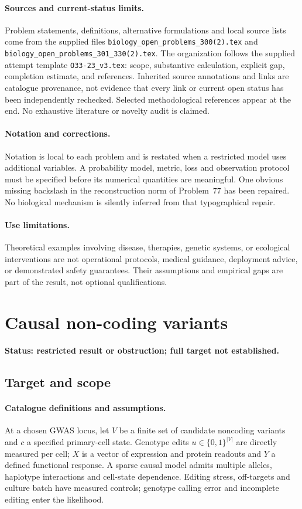 \documentclass[11pt]{article}
\begin{document}
\paragraph{Sources and current-status limits.}
Problem statements, definitions, alternative formulations and local source lists
come from the supplied files
\texttt{biology\_open\_problems\_300(2).tex} and
\texttt{biology\_open\_problems\_301\_330(2).tex}.
The organization follows the supplied attempt template
\texttt{O33-23\_v3.tex}: scope, substantive calculation, explicit gap,
completion estimate, and references. Inherited source annotations and links are
catalogue provenance, not evidence that every link or current open status has
been independently rechecked. Selected methodological references appear at the
end. No exhaustive literature or novelty audit is claimed.

\paragraph{Notation and corrections.}
Notation is local to each problem and is restated when a restricted model uses
additional variables. A probability model, metric, loss and observation protocol
must be specified before its numerical quantities are meaningful. One obvious
missing backslash in the reconstruction norm of Problem~77 has been repaired.
No biological mechanism is silently inferred from that typographical repair.

\paragraph{Use limitations.}
Theoretical examples involving disease, therapies, genetic systems, or ecological
interventions are not operational protocols, medical guidance, deployment advice,
or demonstrated safety guarantees. Their assumptions and empirical gaps are part
of the result, not optional qualifications.


\section*{Causal non-coding variants}
\label{prob:027}
\noindent\textbf{Status: restricted result or obstruction; full target not established.}
\subsection{Target and scope}
\paragraph{Catalogue definitions and assumptions.}
At a chosen GWAS locus, let $V$ be a finite set of candidate noncoding variants and $c$ a specified primary-cell state. Genotype edits $u\in\{0,1\}^{|V|}$ are directly measured per cell; $X$ is a vector of expression and protein readouts and $Y$ a defined functional response. A sparse causal model admits multiple alleles, haplotype interactions and cell-state dependence. Editing stress, off-targets and culture batch have measured controls; genotype calling error and incomplete editing enter the likelihood.
\end{document}
